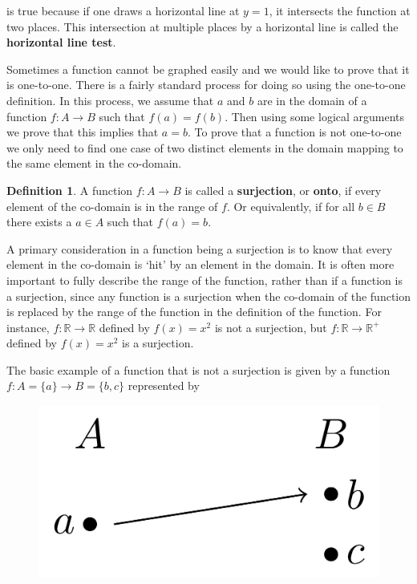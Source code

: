 \documentclass[
]{book}
\theoremstyle{definition}
\newtheorem{definition}{Definition}[chapter]
\theoremstyle{definition}
\theoremstyle{definition}
\theoremstyle{definition}
\theoremstyle{remark}
\begin{document}
is true because if one draws a horizontal line at \(y=1\), it intersects the function at two places. This intersection at multiple places by a horizontal line is called the \textbf{horizontal line test}.

Sometimes a function cannot be graphed easily and we would like to prove that it is one-to-one. There is a fairly standard process for doing so using the one-to-one definition. In this process, we assume that \(a\) and \(b\) are in the domain of a function \(f:A\rightarrow B\) such that \(f(a)=f(b)\). Then using some logical arguments we prove that this implies that \(a=b\). To prove that a function is not one-to-one we only need to find one case of two distinct elements in the domain mapping to the same element in the co-domain.

\begin{definition}
A function \(f:A\rightarrow B\) is called a \textbf{surjection}, or \textbf{onto}, if every element of the co-domain is in the range of \(f\). Or equivalently, if for all \(b\in B\) there exists a \(a\in A\) such that \(f(a)=b\).
\end{definition}

A primary consideration in a function being a surjection is to know that every element in the co-domain is `hit' by an element in the domain. It is often more important to fully describe the range of the function, rather than if a function is a surjection, since any function is a surjection when the co-domain of the function is replaced by the range of the function in the definition of the function. For instance, \(f:\mathbb{R}\rightarrow \mathbb{R}\) defined by \(f(x)=x^2\) is not a surjection, but \(f:\mathbb{R}\rightarrow \mathbb{R}^+\) defined by \(f(x)=x^2\) is a surjection.

The basic example of a function that is not a surjection is given by a function \(f:A=\{a\} \rightarrow B=\{b,c\}\) represented by

\begin{figure}

{\centering \includegraphics[width=0.3\linewidth]{tikz/example-nonsurjection} 

}

\end{figure}
\end{document}
